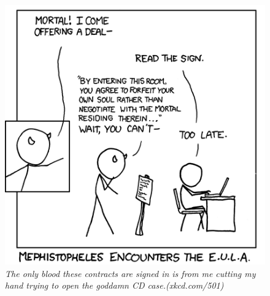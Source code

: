 \vfill
\begin{figure}[h!]
\centering
\includegraphics[scale=.6]{img/xkcd/eula_faust_20.png}
\caption*{{\small \textit{The only blood these contracts are signed in is from me cutting my hand trying to open the goddamn CD case.(xkcd.com/501)}}}
\end{figure}

